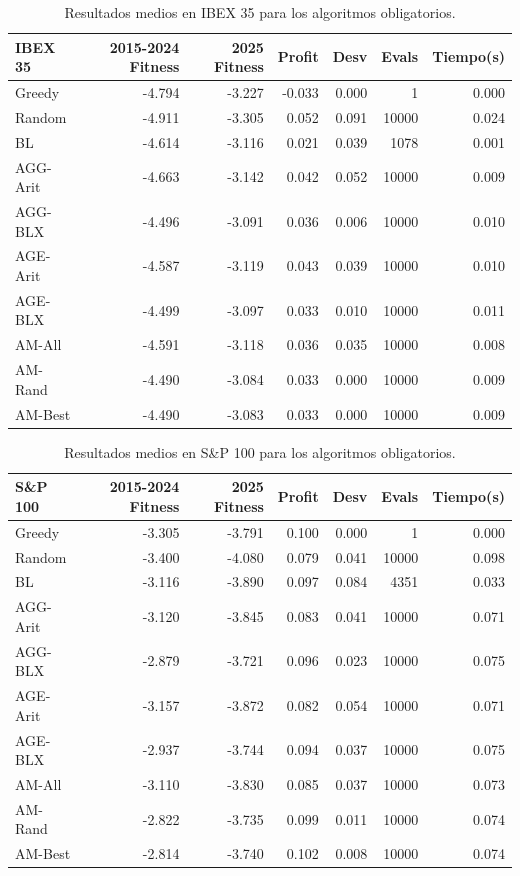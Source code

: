 \begin{table}[H]
\centering
\scriptsize
\begin{tabular}{@{}lrrrrrr@{}}
\toprule
\textbf{IBEX 35} & \textbf{2015-2024 Fitness} & \textbf{2025 Fitness} & \textbf{Profit} & \textbf{Desv} & \textbf{Evals} & \textbf{Tiempo(s)} \\
\midrule
Greedy    & -4.794 & -3.227 & -0.033 & 0.000 & 1     & 0.000 \\
Random    & -4.911 & -3.305 &  0.052 & 0.091 & 10000 & 0.024 \\
BL        & -4.614 & -3.116 &  0.021 & 0.039 & 1078  & 0.001 \\
AGG-Arit  & -4.663 & -3.142 &  0.042 & 0.052 & 10000 & 0.009 \\
AGG-BLX   & -4.496 & -3.091 &  0.036 & 0.006 & 10000 & 0.010 \\
AGE-Arit  & -4.587 & -3.119 &  0.043 & 0.039 & 10000 & 0.010 \\
AGE-BLX   & -4.499 & -3.097 &  0.033 & 0.010 & 10000 & 0.011 \\
AM-All    & -4.591 & -3.118 &  0.036 & 0.035 & 10000 & 0.008 \\
AM-Rand   & -4.490 & -3.084 &  0.033 & 0.000 & 10000 & 0.009 \\
AM-Best   & -4.490 & -3.083 &  0.033 & 0.000 & 10000 & 0.009 \\
\bottomrule
\end{tabular}
\caption{Resultados medios en IBEX 35 para los algoritmos obligatorios.}
\label{tab:ibex-oblig}
\end{table}

\begin{table}[H]
\centering
\scriptsize
\begin{tabular}{@{}lrrrrrr@{}}
\toprule
\textbf{S\&P 100} & \textbf{2015-2024 Fitness} & \textbf{2025 Fitness} & \textbf{Profit} & \textbf{Desv} & \textbf{Evals} & \textbf{Tiempo(s)} \\
\midrule
Greedy    & -3.305 & -3.791 & 0.100 & 0.000 & 1     & 0.000 \\
Random    & -3.400 & -4.080 & 0.079 & 0.041 & 10000 & 0.098 \\
BL        & -3.116 & -3.890 & 0.097 & 0.084 & 4351  & 0.033 \\
AGG-Arit  & -3.120 & -3.845 & 0.083 & 0.041 & 10000 & 0.071 \\
AGG-BLX   & -2.879 & -3.721 & 0.096 & 0.023 & 10000 & 0.075 \\
AGE-Arit  & -3.157 & -3.872 & 0.082 & 0.054 & 10000 & 0.071 \\
AGE-BLX   & -2.937 & -3.744 & 0.094 & 0.037 & 10000 & 0.075 \\
AM-All    & -3.110 & -3.830 & 0.085 & 0.037 & 10000 & 0.073 \\
AM-Rand   & -2.822 & -3.735 & 0.099 & 0.011 & 10000 & 0.074 \\
AM-Best   & -2.814 & -3.740 & 0.102 & 0.008 & 10000 & 0.074 \\
\bottomrule
\end{tabular}
\caption{Resultados medios en S\&P 100 para los algoritmos obligatorios.}
\label{tab:sp100-oblig}
\end{table}


